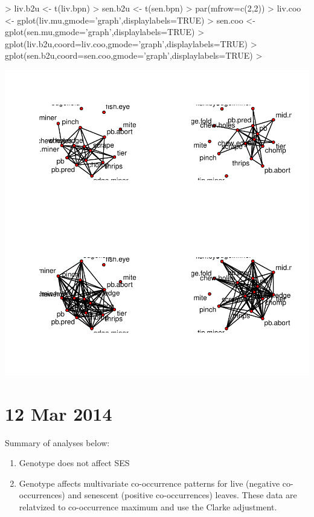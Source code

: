 \documentclass[12pt]{article}
\begin{document}
\begin{Schunk}
\begin{Sinput}
> liv.b2u <- t(liv.bpn) %
> sen.b2u <- t(sen.bpn) %
> par(mfrow=c(2,2))
> liv.coo <- gplot(liv.mu,gmode='graph',displaylabels=TRUE)
> sen.coo <- gplot(sen.mu,gmode='graph',displaylabels=TRUE)
> gplot(liv.b2u,coord=liv.coo,gmode='graph',displaylabels=TRUE)
> gplot(sen.b2u,coord=sen.coo,gmode='graph',displaylabels=TRUE)
> 
\end{Sinput}
\end{Schunk}
\includegraphics{notebook-010}

\section{12 Mar 2014}

Summary of analyses below:

\begin{enumerate}
\item Genotype does not affect SES
\item Genotype affects multivariate co-occurrence patterns for live
  (negative co-occurrences) and senescent (positive co-occurrences)
  leaves. These data are relatvized to co-occurrence maximum and use
  the Clarke adjustment.
\end{enumerate}
\end{document}
